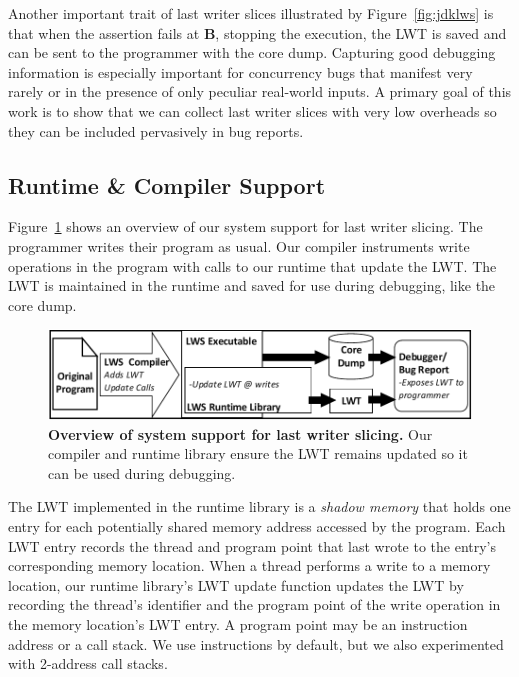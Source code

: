 \documentclass[preprint,9pt]{sigplanconf}
\newcommand{\lwt}{LWT\xspace}
\begin{document}
Another important trait of last writer slices illustrated by
Figure~\ref{fig:jdklws} is that when the assertion fails at {\bf B}, stopping
the execution, the \lwt is saved and can be sent to the programmer with the
core dump.  Capturing good debugging information is especially important for
concurrency bugs that manifest very rarely or in the presence of only peculiar
real-world inputs.  A primary goal of this work is to show that we can collect
last writer slices with very low overheads so they can be included pervasively
in bug reports.


\subsection{Runtime \& Compiler Support}

Figure~\ref{fig:lwsoverview} shows an overview of our system support for last
writer slicing.  The programmer writes their program as usual. Our compiler
instruments write operations in the program with calls to our runtime that
update the \lwt.  The \lwt is maintained in the runtime and saved for use
during debugging, like the core dump. 

\begin{figure}[h]
\centering
\includegraphics[width=.9\columnwidth]{figs/LWS_Overview.pdf}
\caption{\label{fig:lwsoverview}{\bf Overview of system support for last writer slicing.} Our compiler and runtime library ensure the \lwt remains updated so it can be used during debugging.}
\end{figure}

The \lwt implemented in the runtime library is a {\em shadow memory} that holds
one entry for each potentially shared memory address accessed by the program.
Each \lwt entry records the thread and program point that last wrote to the
entry's corresponding memory location.  When a thread performs a write to a
memory location, our runtime library's \lwt update function updates the \lwt by
recording the thread's identifier and the program point of the write operation
in the memory location's \lwt entry.  A program point may be an instruction
address or a call stack.  We use instructions by default, but we also experimented
with 2-address call stacks.   
\end{document}
